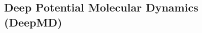 \documentclass[a4paper,11pt,oneside]{article}
\begin{document}
\subsection{Deep Potential Molecular Dynamics (DeepMD)}




\end{document}
